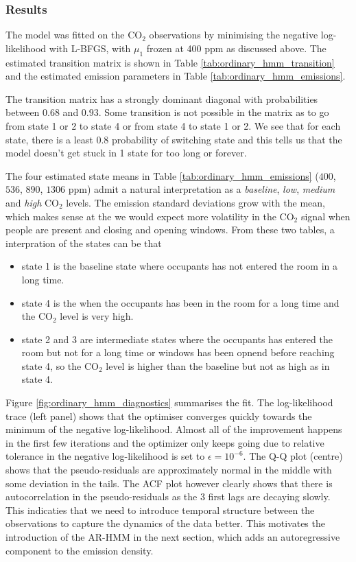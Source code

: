 \subsubsection{Results}
The model was fitted on the $\text{CO}_2$ observations by minimising the negative
log-likelihood with L-BFGS, with $\mu_1$ frozen at 400 ppm as discussed above.
The estimated transition matrix is shown in Table \ref{tab:ordinary_hmm_transition}
and the estimated emission parameters in Table \ref{tab:ordinary_hmm_emissions}.


The transition matrix has a strongly dominant diagonal with
probabilities between $0.68$ and $0.93$. Some transition is not possible in 
the matrix as to go from state 1 or 2 to state 4 or from state 4 to state 1 or 2. 
We see that for each state, there is a least $0.8$ probability of switching 
state and this tells us that the model doesn't get stuck in 1 state for 
too long or forever. 



The four estimated state means in Table \ref{tab:ordinary_hmm_emissions}
($400$, $536$, $890$, $1306$ ppm) admit a natural interpretation as a
\emph{baseline}, \emph{low}, \emph{medium} and \emph{high} CO$_2$ levels. The
emission standard deviations grow with the mean, which makes sense 
at the we would expect more volatility in the CO$_2$ signal 
when people are present and closing and opening windows. \newline
From these two tables, a interpration of the states can be that 
\begin{itemize}
    \item state 1 is the baseline state where occupants has not entered the room in a long time. 
    \item state 4 is the when the occupants has been in the room for a long time and the $\text{CO}_2$ level is very high.
    \item state 2 and 3 are intermediate states where the occupants has entered the room 
    but not for a long time or windows has been opnend before reaching state 4, so the $\text{CO}_2$ level is higher than the baseline but not as high as in state 4.
\end{itemize}



Figure \ref{fig:ordinary_hmm_diagnostics} summarises the fit. The
log-likelihood trace (left panel) shows that the optimiser converges quickly
towards the minimum of the negative log-likelihood. Almost all of the
improvement happens in the first few iterations and the optimizer only keeps going due to 
relative tolerance in the negative log-likelihood is set to $\epsilon = 10^{-6}$.
The Q-Q plot (centre) shows that the pseudo-residuals are approximately normal in the middle
with some deviation in the tails. The ACF plot however clearly shows 
that there is autocorrelation in the pseudo-residuals as the 3 first lags are decaying slowly. 
This indicaties that we need to introduce temporal structure between 
the observations to capture the dynamics of the data better. 
This motivates the introduction of the AR-HMM in the next section, 
which adds an autoregressive component to the emission density.
